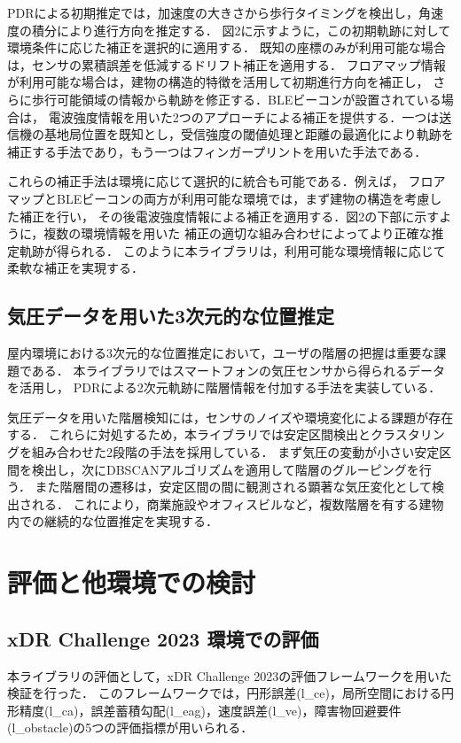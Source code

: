 \documentclass[a4paper, 10pt, twocolumn]{jarticle}
\begin{document}
PDRによる初期推定では，加速度の大きさから歩行タイミングを検出し，角速度の積分により進行方向を推定する．
図2に示すように，この初期軌跡に対して環境条件に応じた補正を選択的に適用する．
既知の座標のみが利用可能な場合は，センサの累積誤差を低減するドリフト補正を適用する．
フロアマップ情報が利用可能な場合は，建物の構造的特徴を活用して初期進行方向を補正し，
さらに歩行可能領域の情報から軌跡を修正する．BLEビーコンが設置されている場合は，
電波強度情報を用いた2つのアプローチによる補正を提供する．一つは送信機の基地局位置を既知とし，受信強度の閾値処理と距離の最適化により軌跡を補正する手法であり，もう一つはフィンガープリントを用いた手法である．

これらの補正手法は環境に応じて選択的に統合も可能である．例えば，
フロアマップとBLEビーコンの両方が利用可能な環境では，まず建物の構造を考慮した補正を行い，
その後電波強度情報による補正を適用する．図2の下部に示すように，複数の環境情報を用いた
補正の適切な組み合わせによってより正確な推定軌跡が得られる．
このように本ライブラリは，利用可能な環境情報に応じて柔軟な補正を実現する．



\subsection{気圧データを用いた3次元的な位置推定}
屋内環境における3次元的な位置推定において，ユーザの階層の把握は重要な課題である．
本ライブラリではスマートフォンの気圧センサから得られるデータを活用し，
PDRによる2次元軌跡に階層情報を付加する手法を実装している．

気圧データを用いた階層検知には，センサのノイズや環境変化による課題が存在する．
これらに対処するため，本ライブラリでは安定区間検出とクラスタリングを組み合わせた2段階の手法を採用している．
まず気圧の変動が小さい安定区間を検出し，次にDBSCANアルゴリズムを適用して階層のグルーピングを行う．
また階層間の遷移は，安定区間の間に観測される顕著な気圧変化として検出される．
これにより，商業施設やオフィスビルなど，複数階層を有する建物内での継続的な位置推定を実現する．



\section{評価と他環境での検討}

\subsection{xDR Challenge 2023 環境での評価}
本ライブラリの評価として，xDR Challenge 2023の評価フレームワークを用いた検証を行った．
このフレームワークでは，円形誤差(l\_ce)，局所空間における円形精度(l\_ca)，誤差蓄積勾配(l\_eag)，速度誤差(l\_ve)，障害物回避要件(l\_obstacle)の5つの評価指標が用いられる．
\end{document}

